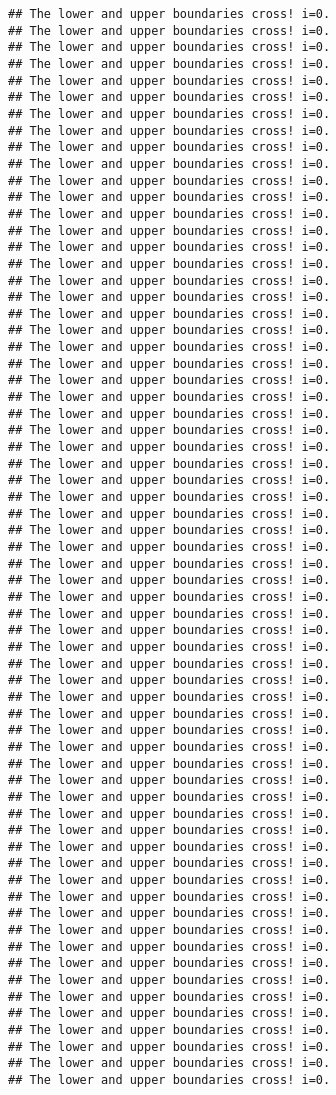 \documentclass[
  12pt,
]{book}
\begin{document}
\begin{verbatim}
## The lower and upper boundaries cross! i=0.
## The lower and upper boundaries cross! i=0.
## The lower and upper boundaries cross! i=0.
## The lower and upper boundaries cross! i=0.
## The lower and upper boundaries cross! i=0.
## The lower and upper boundaries cross! i=0.
## The lower and upper boundaries cross! i=0.
## The lower and upper boundaries cross! i=0.
## The lower and upper boundaries cross! i=0.
## The lower and upper boundaries cross! i=0.
## The lower and upper boundaries cross! i=0.
## The lower and upper boundaries cross! i=0.
## The lower and upper boundaries cross! i=0.
## The lower and upper boundaries cross! i=0.
## The lower and upper boundaries cross! i=0.
## The lower and upper boundaries cross! i=0.
## The lower and upper boundaries cross! i=0.
## The lower and upper boundaries cross! i=0.
## The lower and upper boundaries cross! i=0.
## The lower and upper boundaries cross! i=0.
## The lower and upper boundaries cross! i=0.
## The lower and upper boundaries cross! i=0.
## The lower and upper boundaries cross! i=0.
## The lower and upper boundaries cross! i=0.
## The lower and upper boundaries cross! i=0.
## The lower and upper boundaries cross! i=0.
## The lower and upper boundaries cross! i=0.
## The lower and upper boundaries cross! i=0.
## The lower and upper boundaries cross! i=0.
## The lower and upper boundaries cross! i=0.
## The lower and upper boundaries cross! i=0.
## The lower and upper boundaries cross! i=0.
## The lower and upper boundaries cross! i=0.
## The lower and upper boundaries cross! i=0.
## The lower and upper boundaries cross! i=0.
## The lower and upper boundaries cross! i=0.
## The lower and upper boundaries cross! i=0.
## The lower and upper boundaries cross! i=0.
## The lower and upper boundaries cross! i=0.
## The lower and upper boundaries cross! i=0.
## The lower and upper boundaries cross! i=0.
## The lower and upper boundaries cross! i=0.
## The lower and upper boundaries cross! i=0.
## The lower and upper boundaries cross! i=0.
## The lower and upper boundaries cross! i=0.
## The lower and upper boundaries cross! i=0.
## The lower and upper boundaries cross! i=0.
## The lower and upper boundaries cross! i=0.
## The lower and upper boundaries cross! i=0.
## The lower and upper boundaries cross! i=0.
## The lower and upper boundaries cross! i=0.
## The lower and upper boundaries cross! i=0.
## The lower and upper boundaries cross! i=0.
## The lower and upper boundaries cross! i=0.
## The lower and upper boundaries cross! i=0.
## The lower and upper boundaries cross! i=0.
## The lower and upper boundaries cross! i=0.
## The lower and upper boundaries cross! i=0.
## The lower and upper boundaries cross! i=0.
## The lower and upper boundaries cross! i=0.
## The lower and upper boundaries cross! i=0.
## The lower and upper boundaries cross! i=0.
## The lower and upper boundaries cross! i=0.
## The lower and upper boundaries cross! i=0.
## The lower and upper boundaries cross! i=0.
\end{verbatim}
\end{document}
